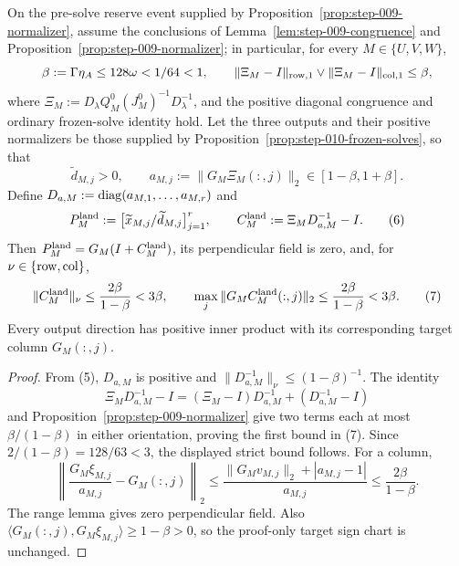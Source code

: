 \begin{proposition}\label{prop:step-010-directions}
On the pre-solve reserve event supplied by Proposition~\ref{prop:step-009-normalizer},
assume the conclusions of Lemma~\ref{lem:step-009-congruence} and
Proposition~\ref{prop:step-009-normalizer}; in particular, for every
\(M\in\{U,V,W\}\),
\[
\beta:=\Gamma\eta_A\le128\omega<1/64<1,\qquad
\|\Xi_M-I\|_{\rm row,1}\vee\|\Xi_M-I\|_{\rm col,1}\le\beta,
\]
where \(\Xi_M:=D_\lambda Q_M^0(J_M^0)^{-1}D_\lambda^{-1}\), and the positive
diagonal congruence and ordinary frozen-solve identity hold.
Let the three outputs and their positive normalizers be those supplied by
Proposition~\ref{prop:step-010-frozen-solves}, so that
\[
\widetilde d_{M,j}>0,\qquad
a_{M,j}:=\|G_M\Xi_M(:,j)\|_2\in[1-\beta,1+\beta].
\]
Define \(D_{a,M}:={\rm diag}(a_{M,1},\ldots,a_{M,r})\) and
\[
P_M^{\rm land}:=\big[\widetilde x_{M,j}/\widetilde d_{M,j}\big]_{j=1}^r,
\qquad C_M^{\rm land}:=\Xi_MD_{a,M}^{-1}-I. \tag{6}
\]
Then \(P_M^{\rm land}=G_M(I+C_M^{\rm land})\), its perpendicular field is
zero, and, for \(\nu\in\{{\rm row},{\rm col}\}\),
\[
\|C_M^{\rm land}\|_\nu\le\frac{2\beta}{1-\beta}<3\beta,\qquad
\max_j\|G_MC_M^{\rm land}(:,j)\|_2
\le\frac{2\beta}{1-\beta}<3\beta. \tag{7}
\]
Every output direction has positive inner product with its corresponding
target column \(G_M(:,j)\).

\begin{proof}
From (5), \(D_{a,M}\) is positive and
\(\|D_{a,M}^{-1}\|_\nu\le(1-\beta)^{-1}\).  The identity
\[
\Xi_MD_{a,M}^{-1}-I
=(\Xi_M-I)D_{a,M}^{-1}+(D_{a,M}^{-1}-I) \tag{8}
\]
and Proposition~\ref{prop:step-009-normalizer} give two terms each at most
\(\beta/(1-\beta)\) in either
orientation, proving the first bound in (7).  Since
\(2/(1-\beta)=128/63<3\), the displayed strict bound follows.
For a column,
\[
\left\|\frac{G_M\xi_{M,j}}{a_{M,j}}-G_M(:,j)\right\|_2
\le\frac{\|G_Mv_{M,j}\|_2+|a_{M,j}-1|}{a_{M,j}}
\le\frac{2\beta}{1-\beta}.
\]
The range lemma gives zero perpendicular field.  Also
\(\langle G_M(:,j),G_M\xi_{M,j}\rangle\ge1-\beta>0\), so the proof-only
target sign chart is unchanged.


\end{proof}
\end{proposition}

